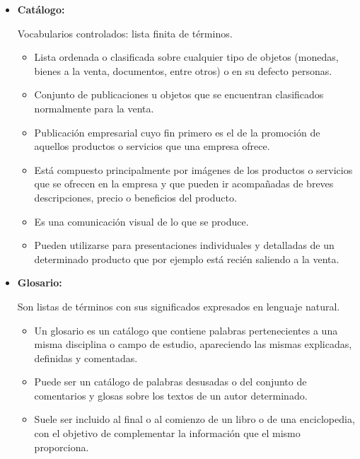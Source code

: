 \documentclass[a4paper,12pt,twoside,final,spanish]{article}
\begin{document}
\begin{itemize}
\item \textbf{Catálogo:}

Vocabularios controlados: lista finita de términos.

\begin{itemize}
\item Lista ordenada o clasificada sobre cualquier tipo de objetos (monedas, bienes a la venta, documentos, entre otros) o en su defecto personas.

\item Conjunto de publicaciones u objetos que se encuentran clasificados normalmente para la venta.

\item Publicación empresarial cuyo fin primero es el de la promoción de aquellos productos o servicios que una empresa ofrece.

\item Está compuesto principalmente por imágenes de los productos o servicios que se ofrecen en la empresa y que pueden ir acompañadas de breves descripciones, precio o beneficios del producto.

\item Es una comunicación visual de lo que se produce.

\item Pueden utilizarse para presentaciones individuales y detalladas de un determinado producto que por ejemplo está recién saliendo a la venta.
\end{itemize}

\item \textbf{Glosario:}

Son listas de términos con sus significados expresados en lenguaje natural. 

\begin{itemize}
\item Un glosario es un catálogo que contiene palabras pertenecientes a una misma disciplina o campo de estudio, apareciendo las mismas explicadas, definidas y comentadas.

\item Puede ser un catálogo de palabras desusadas o del conjunto de comentarios y glosas sobre los textos de un autor determinado.

\item Suele ser incluido al final o al comienzo de un libro o de una enciclopedia, con el objetivo de complementar la información que el mismo proporciona.


\end{itemize}
\end{itemize}
\end{document}
